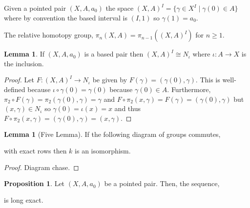 \documentclass[12pt]{extarticle}
\theoremstyle{definition}
\newtheorem{lemma}[theorem]{Lemma}
\newtheorem{proposition}[theorem]{Proposition}
\newenvironment{definition}[1][Definition:]{\begin{trivlist}
\item[\hskip \labelsep {\bfseries #1}]}{\end{trivlist}}
\begin{document}
\begin{definition}
Given a pointed pair $(X, A, a_0)$ the space $(X, A)^I = \{ \gamma \in X^I \mid \gamma(0) \in A \}$ where by convention the based interval is $(I, 1)$ so $\gamma(1) = a_0$. 
\end{definition}

\begin{definition}
The relative homotopy group, $\pi_n(X, A) = \pi_{n - 1}((X, A)^I)$ for $n \ge 1$. 
\end{definition}

\begin{lemma}
If $(X, A, a_0)$ is a based pair then $(X, A)^I \cong N_\iota$ where $\iota : A \to X$ is the inclusion.
\end{lemma}

\begin{proof}
Let $F : (X, A)^I \to N_\iota$ be given by $F(\gamma) = (\gamma(0), \gamma)$. This is well-defined because $\iota \circ \gamma(0) = \gamma(0)$ because $\gamma(0) \in A$. Furthermore, $\pi_2 \circ F(\gamma) = \pi_2(\gamma(0), \gamma) = \gamma$ and $F \circ \pi_2(x, \gamma) = F(\gamma) = (\gamma(0), \gamma)$ but $(x, \gamma) \in N_\iota$ so $\gamma(0) = \iota(x) = x$ and thus $F \circ \pi_2(x, \gamma) = (\gamma(0), \gamma) = (x, \gamma)$.  
\end{proof}

\begin{lemma}[Five Lemma]
If the following diagram of groups commutes,
\begin{center}
\end{center}  
with exact rows then $k$ is an isomorphism.  
\end{lemma}

\begin{proof}
Diagram chase. 
\end{proof}

\begin{proposition}
Let $(X, A, a_0)$ be a pointed pair. Then, the sequence,
\begin{center}
\end{center} 
is long exact.
\end{proposition}
\end{document}
